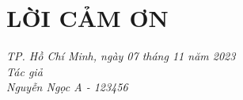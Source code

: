 \chapter*{\centering\Large{LỜI CẢM ƠN}}

\begin{flushright}
\textit {TP. Hồ Chí Minh, ngày 07 tháng 11 năm 2023} \\
\textit {Tác giả} \\
\textit {Nguyễn Ngọc A - 123456}
\end{flushright}

